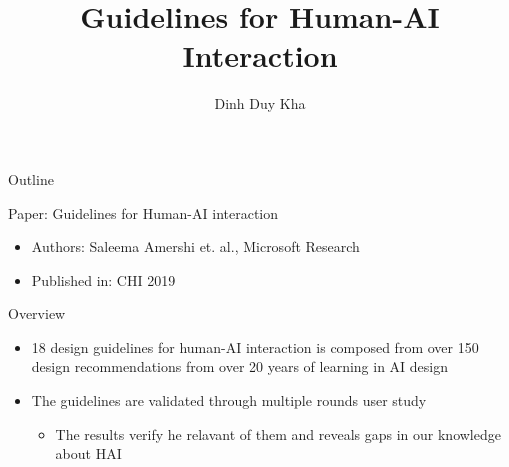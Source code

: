 \documentclass[presentation]{beamer}
\author{Dinh Duy Kha}
\date{}
\title{Guidelines for Human-AI Interaction}
\begin{document}
\maketitle
\begin{frame}{Outline}
\tableofcontents
\end{frame}


\begin{frame}[label={sec:orga9468a1}]{Paper: Guidelines for Human-AI interaction}
\begin{itemize}
\item Authors: Saleema Amershi et. al., Microsoft Research
\item Published in: CHI 2019
\end{itemize}
\begin{block}{Overview}
\begin{itemize}
\item 18 design guidelines for human-AI interaction is composed from over 150 design recommendations from over 20 years of learning in AI design
\item The guidelines are validated through multiple rounds user study
\begin{itemize}
\item The results verify he relavant of them and reveals gaps in our knowledge about HAI
\end{itemize}
\end{itemize}
\end{block}
\end{frame}
\end{document}
